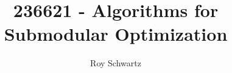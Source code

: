 \documentclass[]{article}
\title{ 	236621 - Algorithms for Submodular Optimization}
\author{Roy Schwartz}
\theoremstyle{bluestyle}
\theoremstyle{redstyle}
\theoremstyle{magentastyle}
\theoremstyle{orangestyle}
\theoremstyle{olivestyle}
\begin{document}
\maketitle

\begin{abstract}

\end{abstract}








\end{document}
